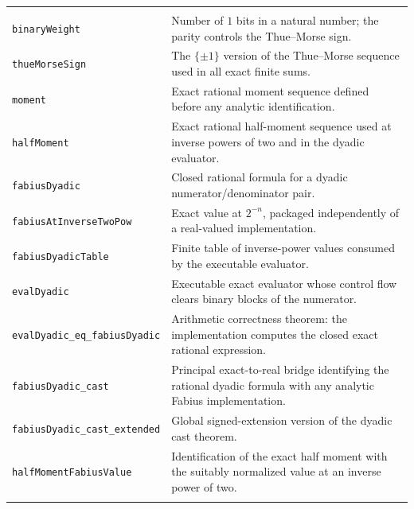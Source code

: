 \documentclass[11pt,a4paper,openany]{book}
\newcommand{\pathbreak}[1]{\nolinkurl{#1}}
\begin{document}
\begin{longtable}{@{}>{\raggedright\arraybackslash}p{}p{}@{}}
\multicolumn{2}{@{}l}{\sffamily\bfseries\color{OliveDark} Exact arithmetic and dyadic evaluation} \\
\addlinespace[.45em]
\pathbreak{binaryWeight} & Number of $1$ bits in a natural number; the parity controls the Thue--Morse sign. \\
\addlinespace[.28em]
\pathbreak{thueMorseSign} & The $\{\pm1\}$ version of the Thue--Morse sequence used in all exact finite sums. \\
\addlinespace[.28em]
\pathbreak{moment} & Exact rational moment sequence defined before any analytic identification. \\
\addlinespace[.28em]
\pathbreak{halfMoment} & Exact rational half-moment sequence used at inverse powers of two and in the dyadic evaluator. \\
\addlinespace[.28em]
\pathbreak{fabiusDyadic} & Closed rational formula for a dyadic numerator/denominator pair. \\
\addlinespace[.28em]
\pathbreak{fabiusAtInverseTwoPow} & Exact value at $2^{-n}$, packaged independently of a real-valued implementation. \\
\addlinespace[.28em]
\pathbreak{fabiusDyadicTable} & Finite table of inverse-power values consumed by the executable evaluator. \\
\addlinespace[.28em]
\pathbreak{evalDyadic} & Executable exact evaluator whose control flow clears binary blocks of the numerator. \\
\addlinespace[.28em]
\pathbreak{evalDyadic_eq_fabiusDyadic} & Arithmetic correctness theorem: the implementation computes the closed exact rational expression. \\
\addlinespace[.28em]
\pathbreak{fabiusDyadic_cast} & Principal exact-to-real bridge identifying the rational dyadic formula with any analytic Fabius implementation. \\
\addlinespace[.28em]
\pathbreak{fabiusDyadic_cast_extended} & Global signed-extension version of the dyadic cast theorem. \\
\addlinespace[.28em]
\pathbreak{halfMomentFabiusValue} & Identification of the exact half moment with the suitably normalized value at an inverse power of two. \\
\addlinespace[.28em]


\end{longtable}
\end{document}
